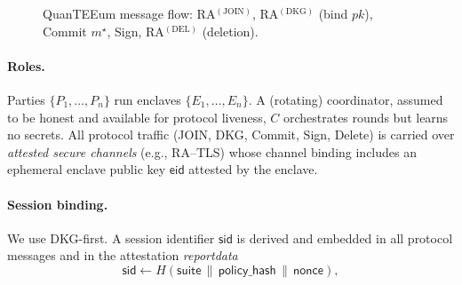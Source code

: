 \documentclass[runningheads,orivec]{llncs}
\newcommand{\RA}{\mathsf{RA}}
\begin{document}
\begin{figure}[H]
\caption{QuanTEEum message flow: RA$^{(\mathrm{JOIN})}$, RA$^{(\mathrm{DKG})}$ (bind $pk$), Commit $m^{\star}$, Sign, RA$^{(\mathrm{DEL})}$ (deletion).}
\label{fig:flow}
\end{figure}

\FloatBarrier

\paragraph{Roles.}
Parties $\{P_1,\dots,P_n\}$ run enclaves $\{E_1,\dots,E_n\}$.
A (rotating) coordinator, assumed to be honest and available for protocol liveness, $C$ orchestrates rounds but learns no secrets.
All protocol traffic (JOIN, DKG, Commit, Sign, Delete) is carried over
\emph{attested secure channels} (e.g., RA--TLS) whose channel binding includes an
ephemeral enclave public key $\mathsf{eid}$ attested by the enclave.

\paragraph{Session binding.}
We use DKG-first. A session identifier $\mathsf{sid}$ is derived and embedded in all protocol messages and in the attestation \emph{reportdata}
\[
  \mathsf{sid} \gets H(\mathsf{suite}\,\|\,\mathsf{policy\_hash}\,\|\,\mathsf{nonce}),
\]
\end{document}
